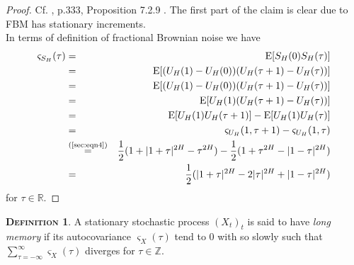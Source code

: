 \documentclass[a4paper, twoside, 11pt]{article}
\theoremstyle{definition}
\newtheorem{definition}{\scshape Definition}[section]
\begin{document}
\begin{proof}
  Cf. \cite{nourdin}, p.333, Proposition 7.2.9 . The first part of the claim is clear due to FBM has stationary increments.\\
  In terms of definition of fractional Brownian noise we have
  \begin{eqnarray*}
	\varsigma_{S_H}(\tau) &=& \mathrm{E}[S_H(0)S_H(\tau)] \\
	&=& \mathrm{E}[(U_H(1) - U_H(0))(U_H(\tau+1)-U_H(\tau))]\\
	&=& \mathrm{E}[(U_H(1) - U_H(0))(U_H(\tau+1)-U_H(\tau))]\\
    &=& \mathrm{E}[U_H(1)(U_H(\tau+1)-U_H(\tau))]\\
	&=& \mathrm{E}[U_H(1)U_H(\tau+1)] - \mathrm{E}[U_H(1)U_H(\tau)]\\
	&=& \varsigma_{U_H}(1, \tau+1) - \varsigma_{U_H}(1, \tau)\\
	&\overset{\text{(\ref{sec:eqn4})}}{=}& \frac{1}{2} (1 + |1+\tau|^{2H} - \tau^{2H}) - \frac{1}{2}(1 + \tau^{2H} - |1 - \tau|^{2H})\\
	&=& \frac{1}{2}(|1+\tau|^{2H} - 2|\tau|^{2H} + |1-\tau|^{2H})
  \end{eqnarray*}
  for $\tau \in \mathbb{R}$.
\end{proof}


\begin{definition}
  A stationary stochastic process $(X_t)_t$ is said to have \emph{long memory} if its autocovariance $\varsigma_X(\tau)$ tend to $0$  with so slowly such that
  $ \sum_{\tau = -\infty} ^{\infty} \varsigma_X(\tau)$ diverges for $\tau \in \mathbb{Z}$.
\end{definition}
\end{document}
